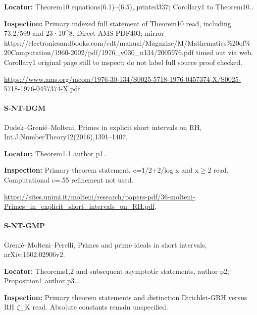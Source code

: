 \documentclass[11pt,a4paper]{article}
\begin{document}
\textbf{Locator:} Theorem10 equations(6.\allowbreak{}1)–\allowbreak{}(6.\allowbreak{}5), printed337; Corollary1 to Theorem10.\allowbreak{}.

\textbf{Inspection:} Primary indexed full statement of Theorem10 read, including 73.\allowbreak{}2/\allowbreak{}599 and 23·10\textasciicircum{}8.\allowbreak{} Direct AMS PDF403; mirror https:\allowbreak{}/\allowbreak{}/\allowbreak{}electronicsandbooks.\allowbreak{}com/\allowbreak{}edt/\allowbreak{}manual/\allowbreak{}Magazine/\allowbreak{}M/\allowbreak{}Mathematics\%20of\%20Computation/\allowbreak{}1960-2002/\allowbreak{}pdf/\allowbreak{}1976\_\allowbreak{}v030\_\allowbreak{}n134/\allowbreak{}2005976.\allowbreak{}pdf timed out via web.\allowbreak{} Corollary1 original page still to inspect; do not label full source proof checked.\allowbreak{}

\url{https://www.ams.org/mcom/1976-30-134/S0025-5718-1976-0457374-X/S0025-5718-1976-0457374-X.pdf}.

\paragraph{S-NT-DGM} Dudek–\allowbreak{}Grenié–\allowbreak{}Molteni, Primes in explicit short intervals on RH, Int.\allowbreak{}J.\allowbreak{}NumberTheory12(2016),1391–\allowbreak{}1407.

\textbf{Locator:} Theorem1.\allowbreak{}1 author p1.\allowbreak{}.

\textbf{Inspection:} Primary theorem statement, c=1/\allowbreak{}2+2/\allowbreak{}log x and x\ensuremath{\ge}2 read.\allowbreak{} Computational c=.\allowbreak{}55 refinement not used.\allowbreak{}

\url{https://sites.unimi.it/molteni/research/papers-pdf/36-molteni-Primes_in_explicit_short_intervals_on_RH.pdf}.

\paragraph{S-NT-GMP} Grenié–\allowbreak{}Molteni–\allowbreak{}Perelli, Primes and prime ideals in short intervals, arXiv:\allowbreak{}1602.\allowbreak{}02906v2.

\textbf{Locator:} Theorems1,2 and subsequent asymptotic statements, author p2; Proposition1 author p3.\allowbreak{}.

\textbf{Inspection:} Primary theorem statements and distinction Dirichlet-GRH versus RH \ensuremath{\zeta}\_\allowbreak{}K read.\allowbreak{} Absolute constants remain unspecified.\allowbreak{}
\end{document}
